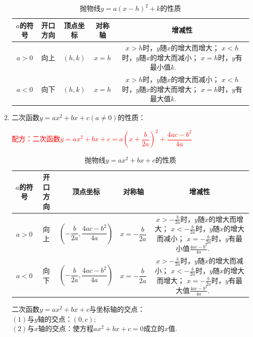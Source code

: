 \documentclass[10pt]{ctexart}
\begin{document}
\begin{enumerate}
\begin{table}[ht]
\centering
\caption{抛物线$y=a(x-h)^2+k$的性质}
\begin{tabular}{|c|c|c|c|c|}
\hline
$a$的符号&开口方向&顶点坐标&对称轴&增减性\\ \hline
$a>0$&向上&$(h,k)$&$x=h$&\makecell{$x>h$时，$y$随$x$的增大而增大；\\$x<h$时，$y$随$x$的增大而减小；\\$x=h$时，$y$有最小值$k$.~~~~~~~~~~~}\\ \hline
$a<0$&向下&$(h,k)$&$x=h$&\makecell{$x>h$时，$y$随$x$的增大而减小；\\$x<h$时，$y$随$x$的增大而增大；\\$x=h$时，$y$有最大值$k$.~~~~~~~~~~~}\\ \hline
\end{tabular}
\end{table}
\item 二次函数$y=ax^2+bx+c(a\neq 0)$的性质：

\textcolor{red}{配方：二次函数$y=ax^2+bx+c=a(x+\dfrac{b}{2a})^2+\dfrac{4ac-b^2}{4a}$}
\begin{table}[ht]
\centering
\caption{抛物线$y=ax^2+bx+c$的性质}
\begin{tabular}{|c|c|c|c|c|}
\hline
$a$的符号&开口方向&顶点坐标&对称轴&增减性\\ \hline
$a>0$&向上&$(-\dfrac{b}{2a},\dfrac{4ac-b^2}{4a})$&$x=-\dfrac{b}{2a}$&\makecell{$x>-\frac{b}{2a}$时，$y$随$x$的增大而增大；\\$x<-\frac{b}{2a}$时，$y$随$x$的增大而减小；\\$x=-\frac{b}{2a}$时，$y$有最小值$\frac{4ac-b^2}{4a}$.~~~~}\\ \hline
$a<0$&向下&$(-\dfrac{b}{2a},\dfrac{4ac-b^2}{4a})$&$x=-\dfrac{b}{2a}$&\makecell{$x>-\frac{b}{2a}$时，$y$随$x$的增大而减小；\\$x<-\frac{b}{2a}$时，$y$随$x$的增大而增大；\\$x=-\frac{b}{2a}$时，$y$有最大值$\frac{4ac-b^2}{4a}$.~~~~}\\ \hline
\end{tabular}
\end{table}
\begin{vuyi}
    二次函数$y=ax^2+bx+c$与坐标轴的交点：\\
    $(1)$与$y$轴的交点：$(0,c)$;\\
    $(2)$与$x$轴的交点：使方程$ax^2+bx+c=0$成立的$x$值.
\end{vuyi}
\end{enumerate}
\end{document}
